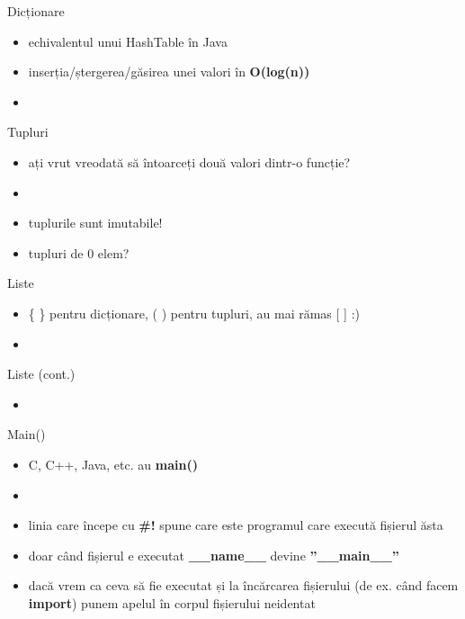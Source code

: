 \documentclass{beamer}
\begin{document}
\begin{frame}{Dicționare}
  \begin{itemize}
  \item echivalentul unui HashTable în Java
  \item inserția/ștergerea/găsirea unei valori în \textbf{O(log(n))}
  \item \small 
  \end{itemize}
\end{frame}



\begin{frame}{Tupluri}
  \begin{itemize}
  \item ați vrut vreodată să întoarceți două valori dintr-o funcție?
  \item  \small 
  \item tuplurile sunt imutabile!
  \item tupluri de 0 elem?
  \end{itemize}
\end{frame}


\begin{frame}{Liste}
  \begin{itemize}
  \item \{ \} pentru dicționare, ( ) pentru tupluri, au mai rămas [ ] :)
  \item \small 
  \end{itemize}
\end{frame}

\begin{frame}{Liste (cont.)}
  \begin{itemize}
  \item \small 
  \end{itemize}
\end{frame}


\begin{frame}{Main()}
  \begin{itemize}
  \item C, C++, Java, etc. au \textbf{main()}
  \item \small 
  \item linia care începe cu \textbf{\#!} spune care este programul care execută fișierul ăsta
  \item doar când fișierul e executat \textbf{\_\_name\_\_} devine \textbf{''\_\_main\_\_''}
  \item dacă vrem ca ceva să fie executat și la încărcarea fișierului 
    (de ex. când facem \textbf{import}) punem apelul în corpul fișierului neidentat
  \end{itemize}
\end{frame}
\end{document}
